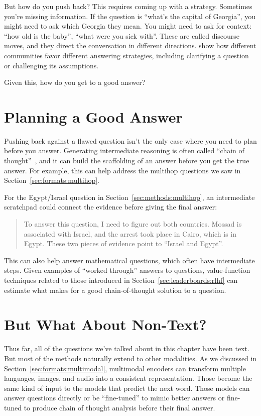 But how do you push back?  This requires coming up with a strategy.  Sometimes you're missing information.  If the question is ``what's the capital of Georgia'', you might need to ask which Georgia they mean.  You might need to ask for context: ``how old is the baby'', ``what were you sick with''.  These are called discourse moves, and they direct the conversation in different directions.  \citet{srikanth-26-discotrace} show how different communities favor different answering strategies, including clarifying a question or challenging its assumptions.

Given this, how do you get to a good answer?

\section{Planning a Good Answer}
\label{sec:methods:planning}

Pushing back against a flawed question isn't the only case where you need to plan before you answer.  Generating intermediate reasoning is often called ``chain of thought''~\citep{wei-22}, and it can build the scaffolding of an answer before you get the true answer.  For example, this can help address the multihop questions we saw in Section~\ref{sec:formats:multihop}.

For the Egypt/Israel question in Section~\ref{sec:methods:multihop}, an intermediate scratchpad could connect the evidence before giving the final answer:
\begin{quote}
To answer this question, I need to figure out both countries.  Mossad is associated with Israel, and the arrest took place in Cairo, which is in Egypt.  These two pieces of evidence point to ``Israel and Egypt''.
\end{quote}

This can also help answer mathematical questions, which often have intermediate steps.  Given examples of ``worked through'' answers to questions, value-function techniques related to those introduced in Section~\ref{sec:leaderboards:rlhf} can estimate what makes for a good chain-of-thought solution to a question.

\section{But What About Non-Text?}
\label{sec:methods:multimodal}

Thus far, all of the questions we've talked about in this chapter have been text.  But most of the methods naturally extend to other modalities.  As we discussed in Section~\ref{sec:formats:multimodal}, multimodal encoders can transform multiple languages, images, and audio into a consistent representation.  Those become the same kind of input to the models that predict the next word.  Those models can answer questions directly or be ``fine-tuned'' to mimic better answers or fine-tuned to produce chain of thought analysis before their final answer.
